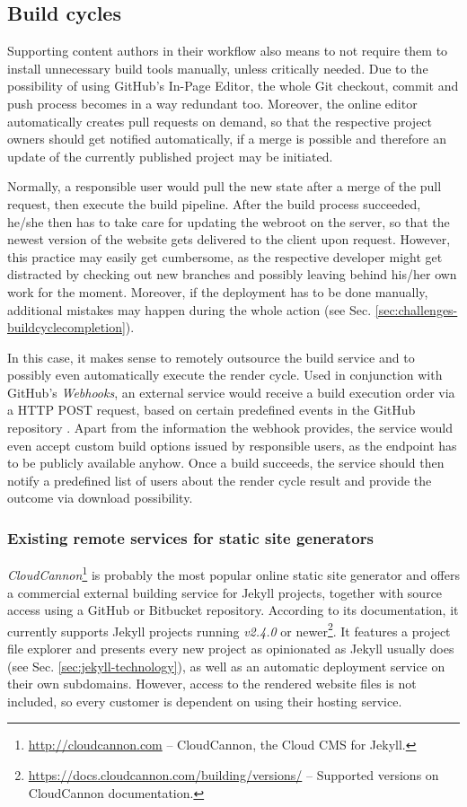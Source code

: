 \subsection{Build cycles}
\label{sec:solutions-remotebuilding}

Supporting content authors in their workflow also means to not require them to install unnecessary build tools manually, unless critically needed. Due to the possibility of using GitHub's In-Page Editor, the whole Git checkout, commit and push process becomes in a way redundant too. Moreover, the online editor automatically creates pull requests on demand, so that the respective project owners should get notified automatically, if a merge is possible and therefore an update of the currently published project may be initiated.

Normally, a responsible user would pull the new state after a merge of the pull request, then execute the build pipeline. After the build process succeeded, he/she then has to take care for updating the webroot on the server, so that the newest version of the website gets delivered to the client upon request. However, this practice may easily get cumbersome, as the respective developer might get distracted by checking out new branches and possibly leaving behind his/her own work for the moment. Moreover, if the deployment has to be done manually, additional mistakes may happen during the whole action (see Sec. \ref{sec:challenges-buildcyclecompletion}).

In this case, it makes sense to remotely outsource the build service and to possibly even automatically execute the render cycle. Used in conjunction with GitHub's \emph{Webhooks}, an external service would receive a build execution order via a HTTP POST request, based on certain predefined events in the GitHub repository \cite{GithubWebhooks}. Apart from the information the webhook provides, the service would even accept custom build options issued by responsible users, as the endpoint has to be publicly available anyhow. Once a build succeeds, the service should then notify a predefined list of users about the render cycle result and provide the outcome via download possibility.

\subsubsection{Existing remote services for static site generators}
\emph{CloudCannon}\footnote{\url{http://cloudcannon.com} -- CloudCannon, the Cloud CMS for Jekyll.} is probably the most popular online static site generator and offers a commercial external building service for Jekyll projects, together with source access using a GitHub or Bitbucket repository. According to its documentation, it currently supports Jekyll projects running \emph{v2.4.0} or newer\footnote{\url{https://docs.cloudcannon.com/building/versions/} -- Supported versions on CloudCannon documentation.}. It features a project file explorer and presents every new project as opinionated as Jekyll usually does (see Sec. \ref{sec:jekyll-technology}), as well as an automatic deployment service on their own subdomains. However, access to the rendered website files is not included, so every customer is dependent on using their hosting service.

